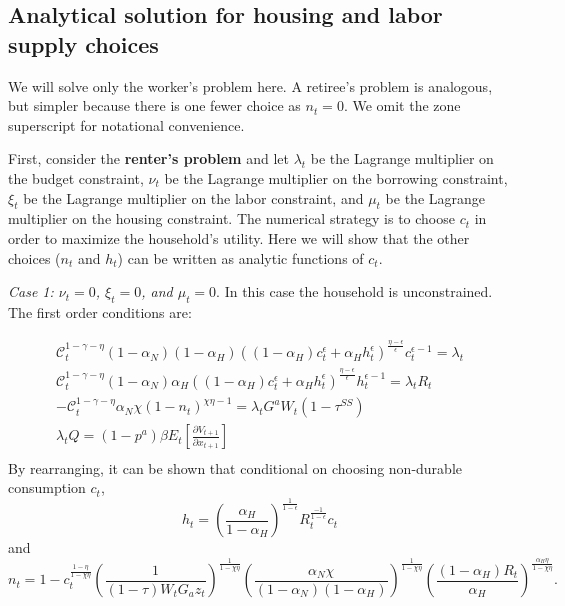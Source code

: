 \documentclass[letterpaper,12pt,dvipsnames,usenames]{article}
\theoremstyle{definition}
\begin{document}
\begin{spacing}{1.0}
\begin{small}
\section{Analytical solution for housing and labor supply choices}\label{app:modeleq}

We will solve only the worker's problem here. A retiree's problem is analogous, but simpler because there is one fewer choice as $n_{t}=0$. We omit the zone superscript for notational convenience.

First, consider the \textbf{renter's problem} and let $\lambda_{t}$ be the Lagrange multiplier on the budget constraint, $\nu_{t}$ be the Lagrange multiplier on the borrowing constraint, $\xi_{t}$ be the Lagrange multiplier on the labor constraint, and $\mu_{t}$ be the Lagrange multiplier on the housing constraint. The numerical strategy is to choose $c_{t}$ in order to maximize the household's utility. Here we will show that the other choices ($n_{t}$ and $h_{t}$) can be written as analytic functions of $c_{t}$.

\emph{Case 1: $\nu_{t}=0$, $\xi_{t}=0$, and $\mu_{t}=0$}. In this case the household is unconstrained. The first order conditions are:

\begin{equation}\label{Eq:RenterFOC}
\begin{array}{l}
\mathcal{C}_{t}^{1-\gamma-\eta}(1-\alpha_{N})(1-\alpha_{H})((1-\alpha_{H})c_{t}^{\epsilon}+\alpha_{H}h_{t}^{\epsilon})^{\frac{\eta-\epsilon}{\epsilon}}c_{t}^{\epsilon-1}=\lambda_{t}\\
\mathcal{C}_{t}^{1-\gamma-\eta}(1-\alpha_{N})\alpha_{H}((1-\alpha_{H})c_{t}^{\epsilon}+\alpha_{H}h_{t}^{\epsilon})^{\frac{\eta-\epsilon}{\epsilon}}h_{t}^{\epsilon-1}=\lambda_{t}R_{t}\\
-\mathcal{C}_{t}^{1-\gamma-\eta}\alpha_{N}\chi(1-n_{t})^{\chi\eta-1}=\lambda_{t}G^{a}W_{t}(1-\tau^{SS})\\
\lambda_{t}Q=(1-p^a)\beta E_{t}[\frac{\partial V_{t+1}}{\partial x_{t+1}}]\\
\end{array}
\end{equation}
By rearranging, it can be shown that conditional on choosing non-durable consumption $c_{t}$,
\begin{equation}\label{Eq:RenterHousingChoice}
h_{t}=\left(\frac{\alpha_{H}}{1-\alpha_{H}}\right)^{\frac{1}{1-\epsilon}}R_{t}^{\frac{-1}{1-\epsilon}}c_{t}
\end{equation}
and
\begin{equation}\label{Eq:RenterHoursChoice}
n_{t}=1-c_{t}^{\frac{1-\eta}{1-\chi\eta}}\left(\frac{1}{(1-\tau)W_{t}G_{a}z_{t}}\right)^{\frac{1}{1-\chi\eta}}\left(\frac{\alpha_{N}\chi}{(1-\alpha_{N})(1-\alpha_{H})}\right)^{\frac{1}{1-\chi\eta}}\left(\frac{(1-\alpha_{H})R_{t}}{\alpha_{H}}\right)^{\frac{\alpha_{H}\eta}{1-\chi\eta}}.
\end{equation}


\end{small}
\end{spacing}
\end{document}
